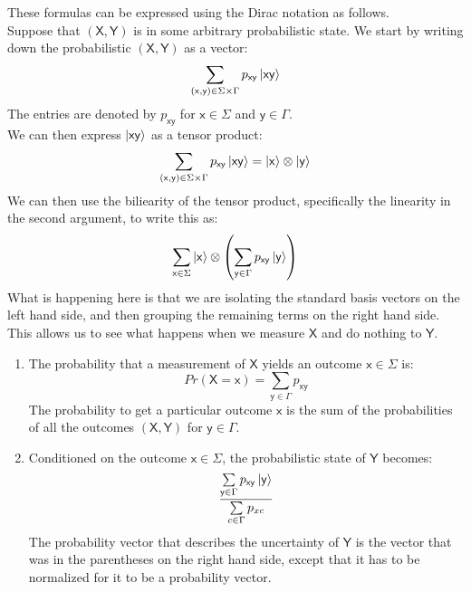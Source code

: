 \documentclass{report}
\begin{document}
\raggedright
These formulas can be expressed using the Dirac notation as follows. \\[1em]
Suppose that $(\mathsf{X},\mathsf{Y})$ is in some arbitrary probabilistic state. We start by writing down the probabilistic $(\mathsf{X},\mathsf{Y})$ as a vector:
\begin{equation*}
    \sum\limits_{(\mathsf{x},\mathsf{y})\in\Sigma\times\Gamma}p_{\mathsf{xy}}\ket{\mathsf{xy}}
\end{equation*}
The entries are denoted by $p_{\mathsf{xy}}$ for $\mathsf{x}\in\Sigma$ and $\mathsf{y}\in\Gamma$.\\[1em]
We can then express $\ket{\mathsf{xy}}$ as a tensor product:
\begin{equation*}
    \sum\limits_{(\mathsf{x},\mathsf{y})\in\Sigma\times\Gamma}p_{\mathsf{xy}}\ket{\mathsf{xy}}=\ket{\mathsf{x}}\otimes\ket{\mathsf{y}}
\end{equation*}
We can then use the biliearity of the tensor product, specifically the linearity in the second argument, to write this as:
\begin{equation*}
    \sum\limits_{\mathsf{x}\in\Sigma}\ket{\mathsf{x}}\otimes\left(\sum\limits_{\mathsf{y}\in\Gamma}p_{\mathsf{xy}}\ket{\mathsf{y}}\right)
\end{equation*}
What is happening here is that we are isolating the standard basis vectors on the left hand side, and then grouping the remaining terms on the right hand side. This allows us to see what happens when we measure $\mathsf{X}$ and do nothing to $\mathsf{Y}$.
\begin{enumerate}
    \item The probability that a measurement of $\mathsf{X}$ yields an outcome $\mathsf{x}\in\Sigma$ is:
    \begin{equation*}
        Pr(\mathsf{X}=\mathsf{x})=\sum\limits_{\mathsf{y}\in\Gamma}p_{\mathsf{xy}}
    \end{equation*}
    The probability to get a particular outcome $\mathsf{x}$ is the sum of the probabilities of all the outcomes $(\mathsf{X},\mathsf{Y})$ for $\mathsf{y}\in\Gamma$.
    \item Conditioned on the outcome $\mathsf{x}\in\Sigma$, the probabilistic state of $\mathsf{Y}$ becomes:
    \begin{equation*}
        \dfrac{\sum\limits_{\mathsf{y}\in\Gamma}p_{\mathsf{xy}}\ket{\mathsf{y}}}{\sum\limits_{c\in\Gamma}p_{xc}}
    \end{equation*}
    The probability vector that describes the uncertainty of $\mathsf{Y}$ is the vector that was in the parentheses on the right hand side, except that it has to be normalized for it to be a probability vector.
\end{enumerate}
\end{document}
